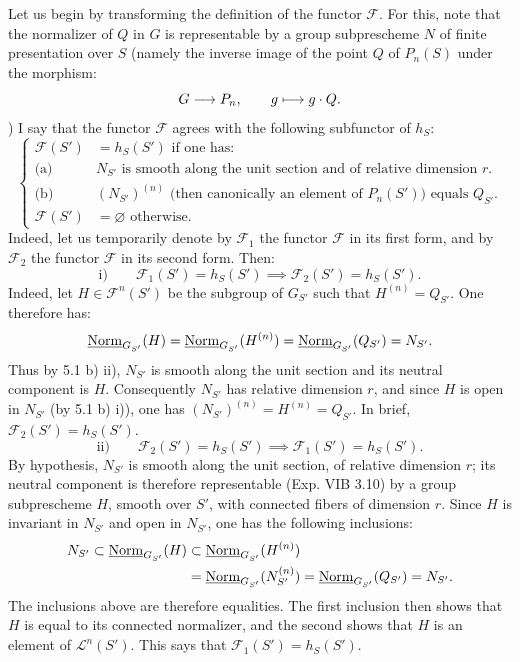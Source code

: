 Let us begin by transforming the definition of the functor $\mathscr F$. For this, note that the normalizer of $Q$ in $G$ is representable by a group subprescheme $N$ of finite presentation over $S$ (namely the inverse image of the point $Q$ of $P_n(S)$ under the morphism:
\[
G\longrightarrow P_n,\qquad g\longmapsto g\cdot Q.
\]
)
I say that the functor $\mathscr F$ agrees with the following subfunctor of $h_S$:
\[
\left\{\begin{aligned}
\mathscr F(S')&=h_S(S')\text{ if one has:}\\
\text{(a)}\quad &N_{S'}\text{ is smooth along the unit section and of relative dimension }r.\\
\text{(b)}\quad &(N_{S'})^{(n)}\text{ (then canonically an element of }P_n(S')\text{) equals }Q_{S'}.\\
\mathscr F(S')&=\varnothing\text{ otherwise.}
\end{aligned}\right.
\]
Indeed, let us temporarily denote by $\mathscr F_1$ the functor $\mathscr F$ in its first form, and by $\mathscr F_2$ the functor $\mathscr F$ in its second form. Then:
\[
\text{i)}\qquad\mathscr F_1(S')=h_S(S')\implies\mathscr F_2(S')=h_S(S').
\]
Indeed, let $H\in\mathscr F^n(S')$ be the subgroup of $G_{S'}$ such that $H^{(n)}=Q_{S'}$. One therefore has:
\[
\underline{\mathrm{Norm}}_{G_{S'}}(H)=\underline{\mathrm{Norm}}_{G_{S'}}(H^{(n)})=\underline{\mathrm{Norm}}_{G_{S'}}(Q_{S'})=N_{S'}.
\]
Thus by 5.1 b) ii), $N_{S'}$ is smooth along the unit section and its neutral component is $H$. Consequently $N_{S'}$ has relative dimension $r$, and since $H$ is open in $N_{S'}$ (by 5.1 b) i)), one has $(N_{S'})^{(n)}=H^{(n)}=Q_{S'}$. In brief, $\mathscr F_2(S')=h_S(S')$.
\[
\text{ii)}\qquad\mathscr F_2(S')=h_S(S')\implies\mathscr F_1(S')=h_S(S').
\]
By hypothesis, $N_{S'}$ is smooth along the unit section, of relative dimension $r$; its neutral component is therefore representable (Exp. VIB 3.10) by a group subprescheme $H$, smooth over $S'$, with connected fibers of dimension $r$. Since $H$ is invariant in $N_{S'}$ and open in $N_{S'}$, one has the following inclusions:
\[
\begin{aligned}
N_{S'}\subset\underline{\mathrm{Norm}}_{G_{S'}}(H)&\subset\underline{\mathrm{Norm}}_{G_{S'}}(H^{(n)})\\
&=\underline{\mathrm{Norm}}_{G_{S'}}(N_{S'}^{(n)})=\underline{\mathrm{Norm}}_{G_{S'}}(Q_{S'})=N_{S'}.
\end{aligned}
\]
The inclusions above are therefore equalities. The first inclusion then shows that $H$ is equal to its connected normalizer, and the second shows that $H$ is an element of $\mathscr L^n(S')$. This says that $\mathscr F_1(S')=h_S(S')$.

